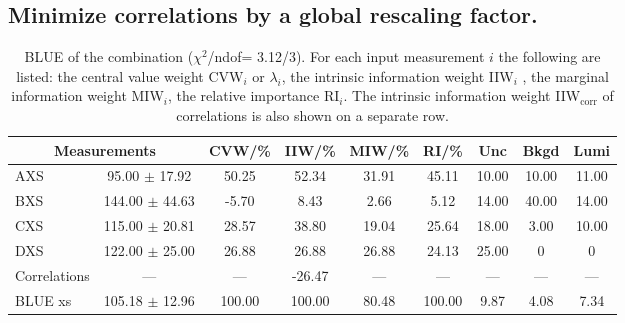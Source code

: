 \subsection{Minimize correlations by a global rescaling factor.}
\begin{table}[H]
\scriptsize
\begin{center}
\renewcommand{\arraystretch}{1.1}
\begin{tabular}{|lc|c|c|c|c|ccc|}
\hline
\multicolumn{2}{|c|}{Measurements} & CVW/\%  & IIW/\%  & MIW/\%  & RI/\%  & {\tiny Unc} & {\tiny Bkgd} & {\tiny Lumi}\\
\hline
AXS &      95.00 $\pm$      17.92 &      50.25 &      52.34 &      31.91 &      45.11 &      10.00 &      10.00 &      11.00\\
BXS &     144.00 $\pm$      44.63 &      -5.70 &       8.43 &       2.66 &       5.12 &      14.00 &      40.00 &      14.00\\
CXS &     115.00 $\pm$      20.81 &      28.57 &      38.80 &      19.04 &      25.64 &      18.00 &       3.00 &      10.00\\
DXS &     122.00 $\pm$      25.00 &      26.88 &      26.88 &      26.88 &      24.13 &      25.00 &  0 &  0\\
Correlations & --- & --- &     -26.47 & --- & --- & --- & --- & ---\\
\hline
BLUE {\tiny xs} &     105.18 $\pm$      12.96 &     100.00 &     100.00 &      80.48 &     100.00 &       9.87 &       4.08 &       7.34\\
\hline
\end{tabular}
\caption{BLUE of the combination ($\chi^2$/ndof=      3.12/3).
 For each input measurement $i$ the following are listed: the central value weight CVW$_i$ or $\lambda_i$, the intrinsic information weight IIW$_i$ , the marginal information weight MIW$_i$, the relative importance RI$_i$. The intrinsic information weight IIW$_{\mathrm{corr}}$ of correlations is also shown on a separate row.}
\renewcommand{\arraystretch}{1}
\end{center}
\end{table}
